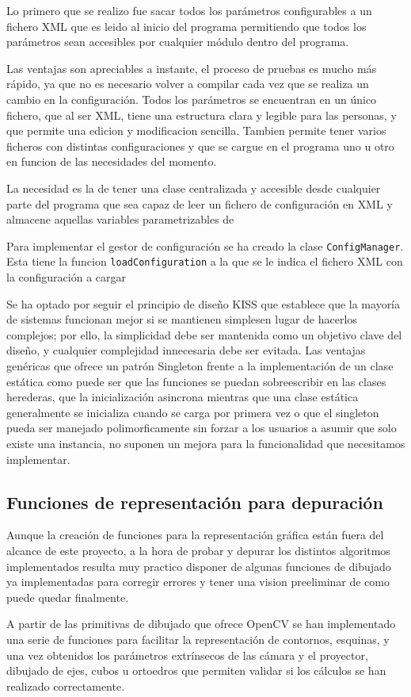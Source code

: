 Lo primero que se realizo fue sacar todos los parámetros configurables a un fichero \acs{XML} que es leido al inicio del programa permitiendo que todos los parámetros sean accesibles por cualquier módulo dentro del programa.

Las ventajas son apreciables a instante, el proceso de pruebas es mucho más rápido, ya que no es necesario volver a compilar cada vez que se realiza un cambio en la configuración. Todos los parámetros se encuentran en un único fichero, que al ser \acs{XML}, tiene una estructura clara y legible para las personas, y que permite una edicion y modificacion sencilla. Tambien permite tener varios ficheros con distintas configuraciones y que se cargue en el programa uno u otro en funcion de las necesidades del momento.
 
La necesidad es la de tener una clase centralizada y accesible desde cualquier parte del programa que sea capaz de leer un fichero de configuración en \acs{XML} y almacene aquellas variables parametrizables de

Para implementar el gestor de configuración se ha creado la clase  \texttt{ConfigManager}. Esta tiene la funcion  \texttt{loadConfiguration} a la que se le indica el fichero \acs{XML} con la configuración a cargar 

Se ha optado por seguir el principio de diseño \acs{KISS} que establece que la mayoría de sistemas funcionan mejor si se mantienen simplesen lugar de hacerlos complejos; por ello, la simplicidad debe ser mantenida como un objetivo clave del diseño, y cualquier complejidad innecesaria debe ser evitada. Las ventajas genéricas que ofrece un patrón Singleton frente a la implementación de un clase estática como puede ser que las funciones se puedan sobreescribir en las clases herederas, que la inicialización asincrona mientras que una clase estática generalmente se inicializa cuando se carga por primera vez o que el singleton pueda ser manejado polimorficamente sin forzar a los usuarios a asumir que solo existe una instancia, no suponen un mejora para la funcionalidad que necesitamos implementar. 

\subsection{Funciones de representación para depuración}
Aunque la creación de funciones para la representación gráfica están fuera del alcance de este proyecto, a la hora de probar y depurar los distintos algoritmos implementados resulta muy practico disponer de algunas funciones de dibujado ya implementadas para corregir errores y tener una vision preeliminar de como puede quedar finalmente.

A partir de las primitivas de dibujado que ofrece OpenCV se han implementado una serie de funciones para facilitar la representación de contornos, esquinas, y una vez obtenidos los parámetros extrínsecos de las cámara y el proyector, dibujado de ejes, cubos u ortoedros que permiten validar si los cálculos se han realizado correctamente.





